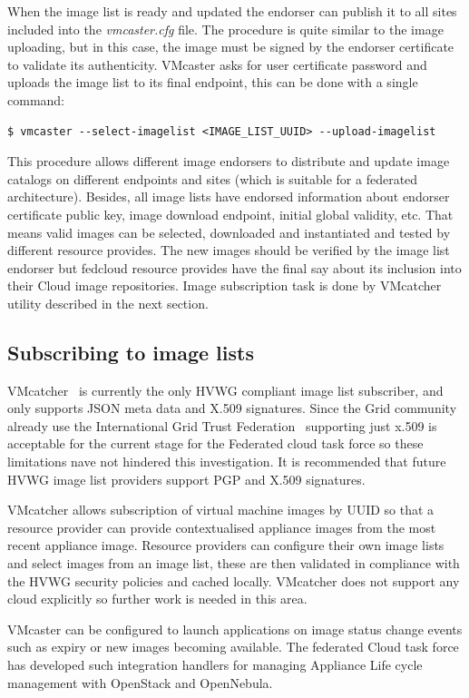 \documentclass{cai}
\begin{document}
When the image list is ready and updated the endorser can publish it to all sites included into the \textit{vmcaster.cfg} file. 
The procedure is quite similar to the image uploading, but in this case, the image must be signed by the endorser certificate to validate its authenticity.
VMcaster asks for user certificate password and uploads the image list to its final endpoint, this can be done with a single command:
\begin{verbatim}
$ vmcaster --select-imagelist <IMAGE_LIST_UUID> --upload-imagelist
\end{verbatim}
This procedure allows different image endorsers to distribute and update image catalogs on different endpoints and sites (which is suitable for a federated architecture).
Besides, all image lists have endorsed information about endorser certificate public key, image download endpoint, initial global validity, etc. 
That means valid images can be selected, downloaded and instantiated and tested by different resource provides. 
The new images should be verified by the image list endorser but fedcloud resource provides have the final say about its inclusion into their Cloud image repositories. 
Image subscription task is done by VMcatcher utility described in the next section.


\subsection{Subscribing to image lists}
VMcatcher~\cite{vmcatcher} is currently the only HVWG compliant image list subscriber, and only supports JSON meta data and X.509 signatures. Since the Grid community already use the International Grid Trust Federation~\cite{igtf} supporting just x.509 is acceptable for the current stage for the Federated cloud task force so these limitations nave not hindered this investigation. 
It is recommended that future HVWG image list providers support PGP and X.509 signatures.

VMcatcher allows subscription of virtual machine images by UUID so that a resource provider can provide contextualised appliance images from the most recent appliance image. Resource providers can configure their own image lists and select images from an image list, these are then validated in compliance with the HVWG security policies and cached locally. 
VMcatcher does not support any cloud explicitly so further work is needed in this area.

VMcaster can be configured to launch applications on image status change events such as expiry or new images becoming available. The federated Cloud task force has developed such integration handlers for managing Appliance Life cycle management with OpenStack and OpenNebula.
\end{document}

